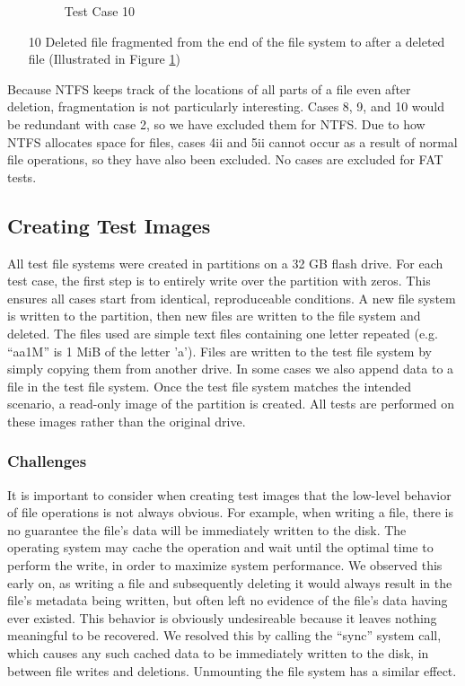 \begin{itemize}
\begin{figure}[h]
        \caption{Test Case 10}
        \label{fig:case_10}
    \end{figure}
    \item [10] Deleted file fragmented from the end of the file system to after a deleted file (Illustrated in Figure \ref{fig:case_10})
\end{itemize}

Because NTFS keeps track of the locations of all parts of a file even after deletion, fragmentation is not particularly interesting. Cases 8, 9, and 10 would be redundant with case 2, so we have excluded them for NTFS. Due to how NTFS allocates space for files, cases 4ii and 5ii cannot occur as a result of normal file operations, so they have also been excluded. No cases are excluded for FAT tests.

\subsection{Creating Test Images}
All test file systems were created in partitions on a 32 GB flash drive. For each test case, the first step is to entirely write over the partition with zeros. This ensures all cases start from identical, reproduceable conditions. A new file system is written to the partition, then new files are written to the file system and deleted. The files used are simple text files containing one letter repeated (e.g. ``aa1M'' is 1 MiB of the letter 'a'). Files are written to the test file system by simply copying them from another drive. In some cases we also append data to a file in the test file system. Once the test file system matches the intended scenario, a read-only image of the partition is created. All tests are performed on these images rather than the original drive.

\subsubsection{Challenges}
It is important to consider when creating test images that the low-level behavior of file operations is not always obvious. For example, when writing a file, there is no guarantee the file's data will be immediately written to the disk. The operating system may cache the operation and wait until the optimal time to perform the write, in order to maximize system performance. We observed this early on, as writing a file and subsequently deleting it would always result in the file's metadata being written, but often left no evidence of the file's data having ever existed. This behavior is obviously undesireable because it leaves nothing meaningful to be recovered. We resolved this by calling the ``sync'' system call, which causes any such cached data to be immediately written to the disk, in between file writes and deletions. Unmounting the file system has a similar effect.

